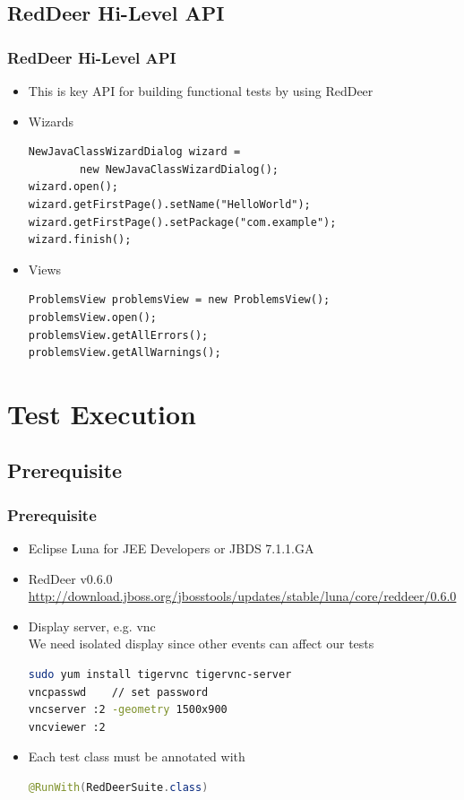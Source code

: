 \documentclass{beamer}
\begin{document}
\subsection{RedDeer Hi-Level API}
\begin{frame}[fragile]
\frametitle{RedDeer Hi-Level API}
\begin{itemize}
\item This is key API for building functional tests by using RedDeer
\item Wizards
\begin{lstlisting}
NewJavaClassWizardDialog wizard =
        new NewJavaClassWizardDialog();
wizard.open();
wizard.getFirstPage().setName("HelloWorld");
wizard.getFirstPage().setPackage("com.example");
wizard.finish();
\end{lstlisting}
\item Views
\begin{lstlisting}
ProblemsView problemsView = new ProblemsView();
problemsView.open();
problemsView.getAllErrors();
problemsView.getAllWarnings();
\end{lstlisting}
\end{itemize}
\end{frame}


\section{Test Execution}

\subsection{Prerequisite}
\begin{frame}[fragile]
\frametitle{Prerequisite}
\begin{itemize}
\item Eclipse Luna for JEE Developers or JBDS 7.1.1.GA
\item RedDeer v0.6.0\\\url{http://download.jboss.org/jbosstools/updates/stable/luna/core/reddeer/0.6.0}
\item Display server, e.g. vnc\\We need isolated display since other events can affect our tests
\begin{lstlisting}[language=sh]
sudo yum install tigervnc tigervnc-server
vncpasswd    // set password
vncserver :2 -geometry 1500x900
vncviewer :2
\end{lstlisting}
\item Each test class must be annotated with
\begin{lstlisting}[language=Java]
@RunWith(RedDeerSuite.class)
\end{lstlisting}
\end{itemize}
\end{frame}
\end{document}
